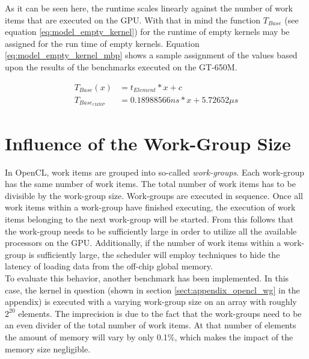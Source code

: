 As it can be seen here, the runtime scales linearly against the number of work items that are executed on the GPU. With that in mind the function $T_{Base}$ (see equation \ref{eq:model_empty_kernel}) for the runtime of empty kernels may be assigned for the run time of empty kernels. Equation \ref{eq:model_empty_kernel_mbp} shows a sample assignment of the values based upon the results of the benchmarks executed on the GT-650M.

\begin{align}
	\label{eq:model_empty_kernel} T_{Base}(x) &= t_{Element}*x+c \\
	\label{eq:model_empty_kernel_mbp}T_{Base_{rMBP}} &= 0.18988566ns * x + 5.72652\mu s
\end{align}

\newpage



\section{Influence of the Work-Group Size}
\label{sect:model_wgsize}

In OpenCL, work items are grouped into so-called \textit{work-groups}. Each work-group has the same number of work items. The total number of work items has to be divisible by the work-group size. Work-groups are executed in sequence. Once all work items within a  work-group have finished executing, the execution of work items belonging to the next work-group will be started. From this follows that the work-group needs to be sufficiently large in order to utilize all the available processors on the GPU. Additionally, if the number of work items within a work-group is sufficiently large, the scheduler will employ techniques to hide the latency of loading data from the off-chip global memory. \cite{khronos2012specification,nvidia2009opencl}\\

To evaluate this behavior, another benchmark has been implemented. In this case, the kernel in question (shown in section \ref{sect:appendix_opencl_wg} in the appendix) is executed with a varying work-group size on an array with roughly $2^{20}$ elements. The imprecision is due to the fact that the work-groups need to be an even divider of the total number of work items. At that number of elements the amount of memory will vary by only 0.1\%, which makes the impact of the memory size negligible. \\

